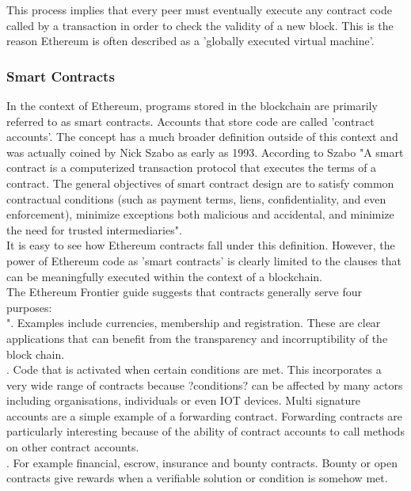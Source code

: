 This process implies that every peer must eventually execute any contract code called by a transaction in order to check the validity of a new block. This is the reason Ethereum is often described as a 'globally executed virtual machine'.

\subsubsection{Smart Contracts}
In the context of Ethereum, programs stored in the blockchain are primarily referred to as smart contracts. Accounts that store code are called 'contract accounts'. The concept has a much broader definition outside of this context and was actually coined by Nick Szabo as early as 1993. According to Szabo "A smart contract is a computerized transaction protocol that executes the terms of a contract. The general objectives of smart contract design are to satisfy common contractual conditions (such as payment terms, liens, confidentiality, and even enforcement), minimize exceptions both malicious and accidental, and minimize the need for trusted intermediaries"\cite{SmartContract}. \\

It is easy to see how Ethereum contracts fall under this definition. However, the power of Ethereum code as 'smart contracts' is clearly limited to the clauses that can be meaningfully executed within the context of a blockchain.\\

The Ethereum Frontier guide\cite{Contracts_guide} suggests that contracts generally serve four purposes: \\

". Examples include currencies, membership and registration. These are clear applications that can benefit from the transparency and incorruptibility of the block chain.\\


. Code that is activated when certain conditions are met. This incorporates a very wide range of contracts because ?conditions? can be affected by many actors including organisations, individuals or even IOT devices. Multi signature accounts are a simple example of a forwarding contract. Forwarding contracts are particularly interesting because of the ability of contract accounts to call methods on other contract accounts.\\


. For example financial, escrow, insurance and bounty contracts. Bounty or open contracts give rewards when a verifiable solution or condition is somehow met. \\


